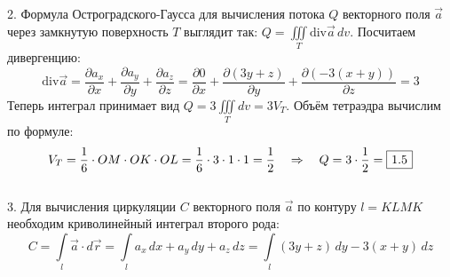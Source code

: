 \documentclass[a3paper,14pt]{extarticle}
\newcommand*\squared[1]{\tikz[baseline=(char.base)]{
            \node[shape=rectangle,draw,inner sep=4pt] (char) {#1};}}
\begin{document}
2. Формула Остроградского-Гаусса для вычисления потока $Q$ векторного поля $\vec{a}$ через замкнутую поверхность $T$ выглядит так: $Q = \iiint\limits_T\text{div}\vec{a}\,dv$. Посчитаем дивергенцию: $$\text{div}\vec{a} = \frac{\partial a_x}{\partial x} + \frac{\partial a_y}{\partial y} + \frac{\partial a_z}{\partial z} = \frac{\partial 0}{\partial x} + \frac{\partial (3y+z)}{\partial y} + \frac{\partial (-3(x+y))}{\partial z} = 3$$
Теперь интеграл принимает вид $Q = 3\iiint\limits_T dv = 3V_T$. Объём тетраэдра вычислим по формуле: $$V_T = \frac{1}{6}\cdot OM\cdot OK\cdot OL = \frac{1}{6}\cdot3\cdot1\cdot1 = \frac{1}{2} \quad \Rightarrow \quad Q = 3\cdot\frac{1}{2} = \squared{$1.5$}$$\\[2em]
3. Для вычисления циркуляции $C$ векторного поля $\vec{a}$ по контуру $l = KLMK$ необходим криволинейный интеграл второго рода:
$$C = \int\limits_{l}\vec{a}\cdot d\vec{r}= \int\limits_{l}a_x\,dx + a_y\,dy + a_z\,dz = \int\limits_{l}(3y + z)\,dy - 3(x + y)\,dz$$
\end{document}
